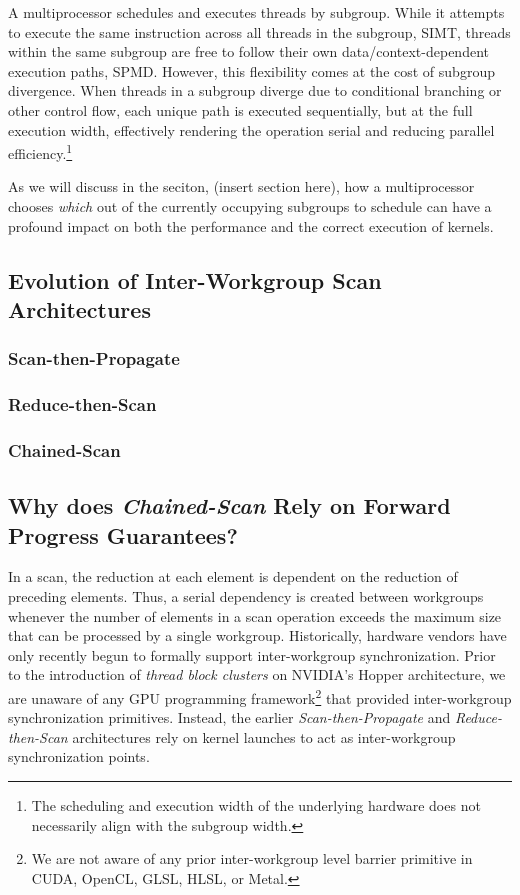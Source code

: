 \documentclass[sigconf]{acmart}
\begin{document}
 A multiprocessor schedules and executes threads by subgroup. While it attempts to execute the same instruction across all threads in the subgroup, SIMT, threads within the same subgroup are free to follow their own data/context-dependent execution paths, SPMD. However, this flexibility comes at the cost of subgroup divergence. When threads in a subgroup diverge due to conditional branching or other control flow, each unique path is executed sequentially, but at the full execution width, effectively rendering the operation serial and reducing parallel efficiency.\footnote{The scheduling and execution width of the underlying hardware does not necessarily align with the subgroup width.} 
 
 As we will discuss in the seciton, (insert section here), how a multiprocessor chooses \emph{which} out of the currently occupying subgroups to schedule can have a profound impact on both the performance and the correct execution of kernels. 

\subsection{Evolution of Inter-Workgroup Scan Architectures}
\subsubsection{Scan-then-Propagate}
\subsubsection{Reduce-then-Scan}
\subsubsection{Chained-Scan}

\subsection{Why does \emph{Chained-Scan} Rely on Forward Progress Guarantees?}
 In a scan, the reduction at each element is dependent on the reduction of preceding elements. Thus, a serial dependency is created between workgroups whenever the number of elements in a scan operation exceeds the maximum size that can be processed by a single workgroup. Historically, hardware vendors have only recently begun to formally support inter-workgroup synchronization. Prior to the introduction of \emph{thread block clusters} on NVIDIA's Hopper architecture\cite{}, we are unaware of any GPU programming framework\footnote{We are not aware of any prior inter-workgroup level barrier primitive in CUDA, OpenCL, GLSL, HLSL, or Metal.} that provided inter-workgroup synchronization primitives. Instead, the earlier \emph{Scan-then-Propagate} and \emph{Reduce-then-Scan} architectures rely on kernel launches to act as inter-workgroup synchronization points\cite{}. 
 
\end{document}
